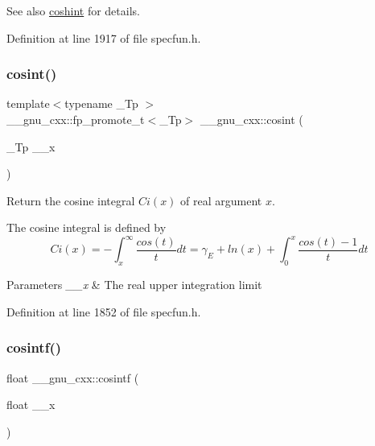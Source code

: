 \begin{DoxySeeAlso}{See also}
\hyperlink{group__gnu__math__spec__func_ga2411d513d418180285ace6650c7b7e31}{coshint} for details. 
\end{DoxySeeAlso}


Definition at line 1917 of file specfun.\+h.

\mbox{\label{group__gnu__math__spec__func_gafd398869cde057087e6b3428a1d13a93}} 
\subsubsection{\texorpdfstring{cosint()}{cosint()}}
{\footnotesize\ttfamily template$<$typename \+\_\+\+Tp $>$ \\
\+\_\+\+\_\+gnu\+\_\+cxx\+::fp\+\_\+promote\+\_\+t$<$\+\_\+\+Tp$>$ \+\_\+\+\_\+gnu\+\_\+cxx\+::cosint (\begin{DoxyParamCaption}\item[{\+\_\+\+Tp}]{\+\_\+\+\_\+x }\end{DoxyParamCaption})\hspace{0.3cm}{\ttfamily [inline]}}

Return the cosine integral $ Ci(x) $ of real argument $ x $.

The cosine integral is defined by \[ Ci(x) = -\int_x^\infty \frac{cos(t)}{t}dt = \gamma_E + ln(x) + \int_0^x \frac{cos(t)-1}{t}dt \]


\begin{DoxyParams}{Parameters}
{\em \+\_\+\+\_\+x} & The real upper integration limit \\
\hline
\end{DoxyParams}


Definition at line 1852 of file specfun.\+h.

\mbox{\label{group__gnu__math__spec__func_ga87202351dc97d2c69e42bf58f911fb5a}} 
\subsubsection{\texorpdfstring{cosintf()}{cosintf()}}
{\footnotesize\ttfamily float \+\_\+\+\_\+gnu\+\_\+cxx\+::cosintf (\begin{DoxyParamCaption}\item[{float}]{\+\_\+\+\_\+x }\end{DoxyParamCaption})\hspace{0.3cm}{\ttfamily [inline]}}

